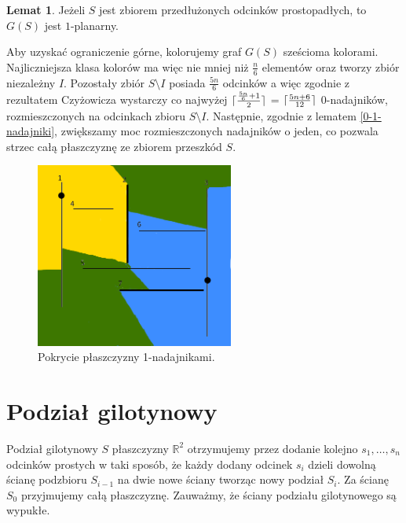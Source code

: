 \documentclass[brudnopis]{xmgr}
\DeclarePairedDelimiter\ceil{\lceil}{\rceil}
\theoremstyle{definition}
\newtheorem{Lemat}{Lemat}
\begin{document}
\begin{Lemat} \cite{knadajniki}
  Jeżeli $S$ jest zbiorem przedłużonych odcinków prostopadłych, to $G(S)$ jest $1$-planarny.
\end{Lemat}

\indent Aby uzyskać ograniczenie górne, kolorujemy graf $G(S)$ sześcioma kolorami. Najliczniejsza klasa kolorów ma więc nie mniej niż $\frac{n}{6}$ elementów oraz tworzy zbiór niezależny $I$. Pozostały zbiór $S \setminus I$ posiada $\frac{5n}{6}$ odcinków a więc zgodnie z rezultatem Czyżowicza wystarczy co najwyżej $\ceil{\frac{\frac{5n}{6} + 1}{2}}$ = $\ceil{\frac{5n+6}{12}}$ 0-nadajników, rozmieszczonych na odcinkach zbioru $S \setminus I$. Następnie, zgodnie z lematem \ref{0-1-nadajniki}, zwiększamy moc rozmieszczonych nadajników o jeden, co pozwala strzec całą płaszczyznę ze zbiorem przeszkód $S$.
\begin{figure}[ht!]
  \centering
  \includegraphics[width=6.5cm]{rysunki/pokrycie_nadajnikami.png}
  \caption{Pokrycie płaszczyzny 1-nadajnikami.}
  \label{fig:pokrycie plaszczyzny}
\end{figure} 

\section{Podział gilotynowy}
Podział gilotynowy $S$ płaszczyzny $\mathbb{R}^2$ otrzymujemy przez dodanie kolejno $s_1,\ldots,s_n$ odcinków prostych w taki sposób, że każdy dodany odcinek $s_i$ dzieli dowolną ścianę podzbioru $S_{i-1}$ na dwie nowe ściany tworząc nowy podział $S_i$. Za ścianę $S_0$ przyjmujemy całą płaszczyznę. Zauważmy, że ściany podziału gilotynowego są wypukłe.
\end{document}
